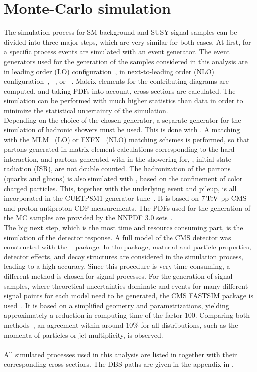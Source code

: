 \section{Monte-Carlo simulation}\label{sec:Simulation}
The simulation process for SM background and SUSY signal samples can be divided into three major steps, which are very similar for both cases. At first, for a specific process events are simulated with an event generator. The event generators used for the generation of the samples considered in this analysis are  in leading order (LO) configuration~\cite{Madgraph1,Madgraph2,Madgraph3}, \MGvATNLO in next-to-leading order (NLO) configuration~\cite{Madgraph1,AMCATNLO}, ~\cite{Pythia}, or \POWHEG~\cite{Powheg1,Powheg2}. Matrix elements for the contributing diagrams are computed, and taking PDFs into account, cross sections are calculated. The simulation can be performed with much higher statistics than data in order to minimize the statistical uncertainty of the simulation.\\
Depending on the choice of the chosen generator, a separate generator for the simulation of hadronic showers must be used. This is done with . A matching with the \textsc{MLM}~\cite{Madgraph2} (LO) or \textsc{FXFX}~\cite{AMCATNLO} (NLO) matching schemes is performed, so that partons generated in matrix element calculations corresponding to the hard interaction, and partons generated with \PYTHIA in the showering for, \eg, initial state radiation (ISR), are not double counted. The hadronization of the partons (quarks and gluons) is also simulated with \PYTHIA, based on the confinement of color charged particles.  This, together with the underlying event and pileup, is all incorporated in the \textsc{CUETP8M1} generator tune~\cite{Tune}. It is based on $7\,\text{Te\hspace{-.08em}V}$ pp CMS and proton-antiproton CDF measurements. The PDFs used for the generation of the MC samples are provided by the \textsc{NNPDF} 3.0 sets~\cite{NNPDF}.\\
The big next step, which is the most time and resource consuming part, is the simulation of the detector response. A full model of the CMS detector was constructed with the \GEANTfour~\cite{Geant} package. In the \GEANTfour package, material and particle properties, detector effects, and decay structures are considered in the simulation process, leading to a high accuracy. Since this procedure is very time consuming, a different method is chosen for signal processes. For the generation of signal samples, where theoretical uncertainties dominate and events for many different signal points for each model need to be generated, the CMS \textsc{FASTSIM} package is used~\cite{FastSim}. It is based on a simplified geometry and parametrizations, yielding approximately a reduction in computing time of the factor $100$. Comparing both methods~\cite{FastSimQuality}, an agreement within around $10\%$ for all distributions, such as the momenta of particles or jet multiplicity, is observed.\\
\\
All simulated processes used in this analysis are listed in  together with their corresponding cross sections. The DBS paths are given in the appendix in .\\


